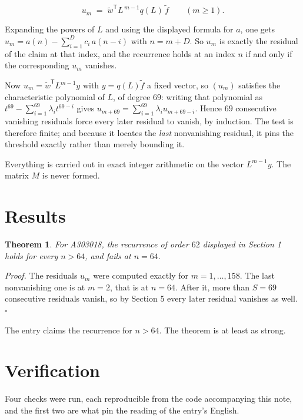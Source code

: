 \documentclass[11pt]{article}
\newtheorem{theorem}{Theorem}
\theoremstyle{definition}
\begin{document}
\[u_m \;=\; \tilde w^{\mathsf T} L^{\,m-1} q(L)\,\tilde f \qquad (m \ge 1).\]

Expanding the powers of $L$ and using the displayed formula for $a$, one gets $u_m = a(n) - \sum_{i=1}^{D} c_i\,a(n-i)$ with $n = m + D$. So $u_m$ is exactly the residual of the claim at that index, and the recurrence holds at an index $n$ if and only if the corresponding $u_m$ vanishes.

Now $u_m = \tilde w^{\mathsf T} L^{m-1} y$ with $y = q(L)\tilde f$ a fixed vector, so $(u_m)$ satisfies the characteristic polynomial of $L$, of degree $69$: writing that polynomial as $t^{69} - \sum_{i=1}^{69} \lambda_i t^{69-i}$ gives $u_{m+69} = \sum_{i=1}^{69} \lambda_i u_{m+69-i}$. Hence $69$ consecutive vanishing residuals force every later residual to vanish, by induction. The test is therefore finite; and because it locates the {\itshape last} nonvanishing residual, it pins the threshold exactly rather than merely bounding it.

Everything is carried out in exact integer arithmetic on the vector $L^{m-1}y$. The matrix $M$ is never formed.

\section{Results}

\begin{theorem} For A303018, the recurrence of order $62$ displayed in Section 1 holds for every $n > 64$, and fails at $n = 64$.\end{theorem}

{\itshape Proof.} The residuals $u_m$ were computed exactly for $m = 1,\dots,158$. The last nonvanishing one is at $m = 2$, that is at $n = 64$. After it, more than $S = 69$ consecutive residuals vanish, so by Section 5 every later residual vanishes as well. $\square$

The entry claims the recurrence for $n > 64$. The theorem is at least as strong.

\section{Verification}

Four checks were run, each reproducible from the code accompanying this note, and the first two are what pin the reading of the entry's English.
\end{document}

